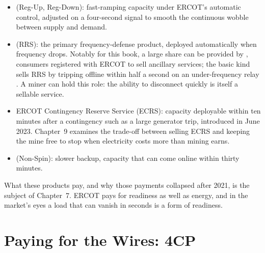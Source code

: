 \begin{itemize}
  \item {} (Reg-Up, Reg-Down): fast-ramping capacity under ERCOT's automatic control, adjusted on a four-second signal to smooth the continuous wobble between supply and demand.
  \item {} (RRS): the primary frequency-defense product, deployed automatically when frequency drops. Notably for this book, a large share can be provided by , consumers registered with ERCOT to sell ancillary services; the basic kind sells RRS by tripping offline within half a second on an under-frequency relay \autocite{ercot2026protocols,ercotnog2026}. A miner can hold this role: the ability to disconnect quickly is itself a sellable service. %
  \item ERCOT Contingency Reserve Service (ECRS): capacity deployable within ten minutes after a contingency such as a large generator trip, introduced in June 2023. Chapter~9 examines the trade-off between selling ECRS and keeping the mine free to stop when electricity costs more than mining earns.
  \item {} (Non-Spin): slower backup, capacity that can come online within thirty minutes.
\end{itemize}

What these products pay, and why those payments collapsed after 2021, is the subject of Chapter~7. ERCOT pays for readiness as well as energy, and in the market's eyes a load that can vanish in seconds is a form of readiness.

\section{Paying for the Wires: 4CP}
\label{sec:4cp-intro}

